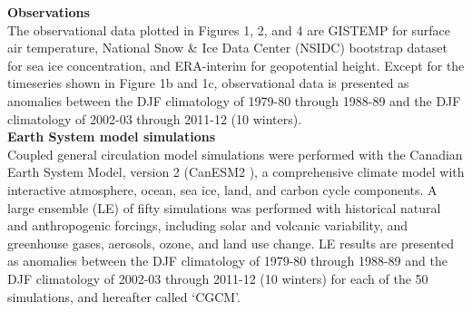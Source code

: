 \documentclass{nature}
\begin{document}
\begin{methods}
\textbf{Observations} \\
The observational data plotted in Figures 1, 2, and 4 are GISTEMP \cite{hansen10} for surface air temperature, National Snow \& Ice Data Center (NSIDC) bootstrap dataset \cite{comiso00} for sea ice concentration, and ERA-interim \cite{dee11} for geopotential height. Except for the timeseries shown in Figure 1b and 1c, observational data is presented as anomalies between the DJF climatology of 1979-80 through 1988-89 and the DJF climatology of 2002-03 through 2011-12 (10 winters).
\\
\textbf{Earth System model simulations}\\
Coupled general circulation model simulations were performed with the Canadian Earth System Model, version 2 (CanESM2 \cite{arora11}), a comprehensive climate model with interactive atmosphere, ocean, sea ice, land, and carbon cycle components. A large ensemble (LE) of fifty simulations was performed with historical natural and anthropogenic forcings, including solar and volcanic variability, and greenhouse gases, aerosols, ozone, and land use change. LE results are presented as anomalies between the DJF climatology of 1979-80 through 1988-89 and the DJF climatology of 2002-03 through 2011-12 (10 winters) for each of the 50 simulations, and hereafter called `CGCM'. 


\end{methods}
\end{document}
